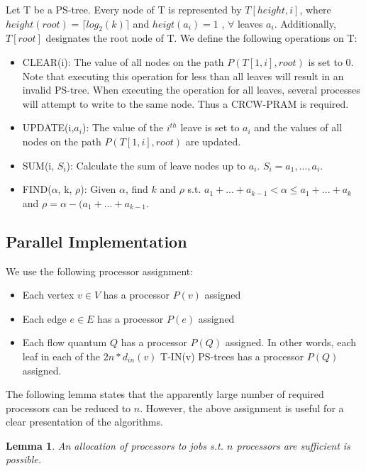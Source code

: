 \documentclass[a4paper,10pt, twocolumn]{article}
\newtheorem{lemma}{Lemma}
\begin{document}
Let T be a PS-tree. Every node of T is represented by $T[height, i]$, where $height(root) = \lceil log_2(k) \rceil$ and $heigt(a_i) = 1$ , $\forall$ leaves $a_i$. Additionally, $T[root]$ designates the root node of T. We define the following operations on T:
\begin{itemize}
	\item CLEAR(i): The value of all nodes on the path $P(T[1,i],root)$ is set to 0. Note that executing this operation for less than all leaves will result in an invalid PS-tree. When executing the operation for all leaves, several processes will attempt to write to the same node. Thus a CRCW-PRAM is required.
	\item UPDATE(i,$a_i$): The value of the $i^{th}$ leave is set to $a_i$ and the values of all nodes on the path $P(T[1,i],root)$ are updated.
	\item SUM(i, $S_i$): Calculate the sum of leave nodes up to $a_i$. $S_i = a_1,...,a_i$.
	\item FIND($\alpha$, k, $\rho$): Given $\alpha$, find $k$ and $\rho$ s.t. $a_1+...+a_{k-1} < \alpha \leq a_1+...+a_k$ and $\rho = \alpha - (a_1+...+a_{k-1}$.
\end{itemize}  

\subsection{Parallel Implementation}
\label{sec:sv_parImpl}
We use the following processor assignment:
\begin{itemize}
	\item Each vertex $v \in V$ has a processor $P(v)$ assigned
	\item Each edge $e \in E$ has a processor $P(e)$ assigned
	\item Each flow quantum $Q$ has a processor $P(Q)$ assigned. In other words, each leaf in each of the $2n * d_{in}(v)$ T-IN(v) PS-trees has a processor $P(Q)$ assigned.
\end{itemize}

The following lemma states that the apparently large number of required processors can be reduced to $n$. However, the above assignment is useful for a clear presentation of the algorithms.

\begin{lemma}
An allocation of processors to jobs s.t. $n$ processors are sufficient is possible. 
\end{lemma}
\end{document}
